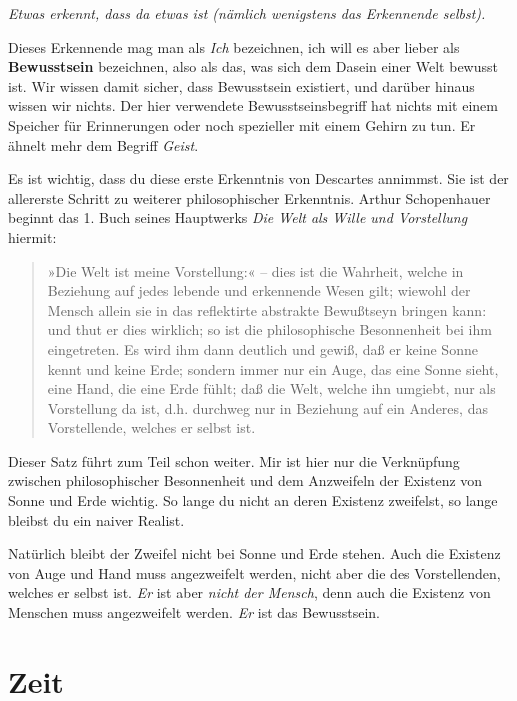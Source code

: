 \documentclass[12pt]{book}
\begin{document}
\emph{Etwas erkennt, dass da etwas ist (nämlich wenigstens das Erkennende selbst).}

Dieses Erkennende mag man als \emph{Ich} bezeichnen, ich will es aber lieber als \textbf{Bewusstsein} bezeichnen, also als das, was sich dem Dasein einer Welt bewusst ist. Wir wissen damit sicher, dass Bewusstsein existiert, und darüber hinaus wissen wir nichts. Der hier verwendete Bewusstseinsbegriff hat nichts mit einem Speicher für Erinnerungen oder noch spezieller mit einem Gehirn zu tun. Er ähnelt mehr dem Begriff \emph{Geist}. 

Es ist wichtig, dass du diese erste Erkenntnis von Descartes annimmst. Sie ist der allererste Schritt zu weiterer philosophischer Erkenntnis. Arthur Schopenhauer beginnt das 1. Buch seines Hauptwerks \emph{Die Welt als Wille und Vorstellung} hiermit: 

\begin{quote}\begin{tcolorbox}
»Die Welt ist meine Vorstellung:« – dies ist die Wahrheit, welche in Beziehung auf jedes lebende und erkennende Wesen gilt; wiewohl der Mensch allein sie in das reflektirte abstrakte Bewußtseyn bringen kann: und thut er dies wirklich; so ist die philosophische Besonnenheit bei ihm eingetreten. Es wird ihm dann deutlich und gewiß, daß er keine Sonne kennt und keine Erde; sondern immer nur ein Auge, das eine Sonne sieht, eine Hand, die eine Erde fühlt; daß die Welt, welche ihn umgiebt, nur als Vorstellung da ist, d.h. durchweg nur in Beziehung auf ein Anderes, das Vorstellende, welches er selbst ist.
\end{tcolorbox}\end{quote}

Dieser Satz führt zum Teil schon weiter. Mir ist hier nur die Verknüpfung zwischen philosophischer Besonnenheit und dem Anzweifeln der Existenz von Sonne und Erde wichtig. So lange du nicht an deren Existenz zweifelst, so lange bleibst du ein naiver Realist. 

Natürlich bleibt der Zweifel nicht bei Sonne und Erde stehen. Auch die Existenz von Auge und Hand muss angezweifelt werden, nicht aber die des Vorstellenden, welches er selbst ist. \emph{Er} ist aber \emph{nicht der Mensch}, denn auch die Existenz von Menschen muss angezweifelt werden. \emph{Er} ist das Bewusstsein.

\section{Zeit}
\end{document}
